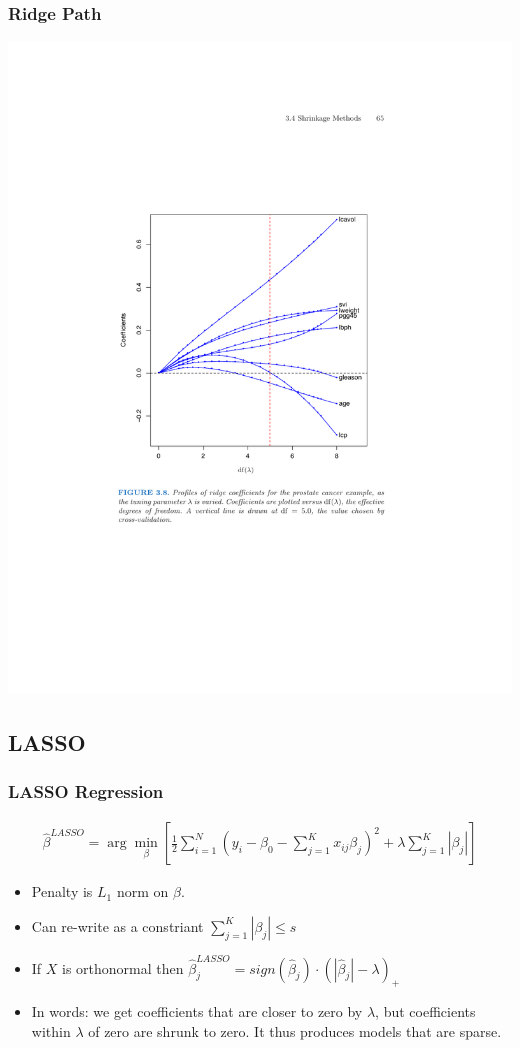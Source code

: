     
\begin{frame}
    \frametitle{Ridge Path}
    \vspace{-15pt}
    \begin{center}
    \includegraphics[height=0.85\textheight]{./resources/ridgepath}
    \end{center}
\end{frame}
    
\subsection{LASSO}

\begin{frame}
\frametitle{LASSO Regression}
\begin{eqnarray*}
\hat{\beta}^{LASSO} = \arg \min_{\beta} \left[\frac{1}{2} \sum_{i=1}^N (y_i - \beta_0 - \sum_{j=1}^K x_{ij} \beta_j)^2 + \lambda \sum_{j=1}^K | \beta_j| \right]
\end{eqnarray*}
\begin{itemize}
\item Penalty is $L_1$ norm on $\beta$.
\item Can re-write as a constriant  $\sum_{j=1}^K | \beta_j| \leq s$
\item If $X$ is orthonormal then $\hat{\beta}_{j}^{LASSO} = sign(\hat{\beta}_j ) \cdot (| \hat{\beta}_j |- \lambda )_{+}$
\item In words: we get coefficients that are closer to zero by $\lambda$, but coefficients within $\lambda$ of zero are shrunk to zero. It thus produces models that are \alert{sparse}.
\end{itemize}
\end{frame}


